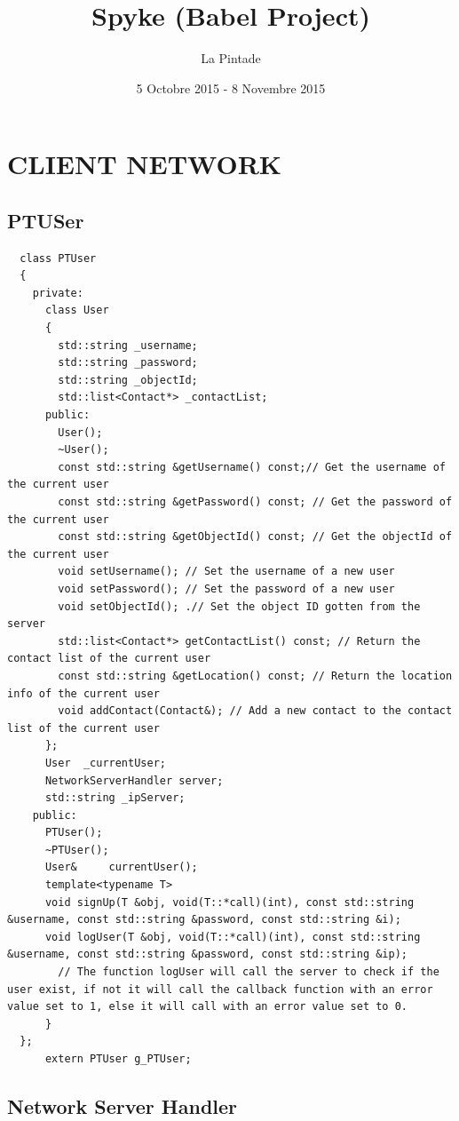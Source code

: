 \documentclass{article}
\title{Spyke (Babel Project)}
\author{La Pintade}
\date{5 Octobre 2015 - 8 Novembre 2015}
\begin{document}
  \maketitle
  \tableofcontents


  \newpage
  \section{CLIENT NETWORK}
  \subsection{PTUSer}
    \begin{lstlisting}
  class PTUser
  {
    private:
      class User
      {
        std::string _username;
        std::string _password;
        std::string _objectId;
        std::list<Contact*> _contactList;
      public:
        User();
        ~User();
        const std::string &getUsername() const;// Get the username of the current user
        const std::string &getPassword() const; // Get the password of the current user
        const std::string &getObjectId() const; // Get the objectId of the current user
        void setUsername(); // Set the username of a new user
        void setPassword(); // Set the password of a new user
        void setObjectId(); .// Set the object ID gotten from the server
        std::list<Contact*> getContactList() const; // Return the contact list of the current user
        const std::string &getLocation() const; // Return the location info of the current user
        void addContact(Contact&); // Add a new contact to the contact list of the current user
      };
      User	_currentUser;
      NetworkServerHandler server;
      std::string _ipServer;
    public:
      PTUser();
      ~PTUser();
      User&		currentUser();
      template<typename T>
      void signUp(T &obj, void(T::*call)(int), const std::string &username, const std::string &password, const std::string &i);
      void logUser(T &obj, void(T::*call)(int), const std::string &username, const std::string &password, const std::string &ip);
        // The function logUser will call the server to check if the user exist, if not it will call the callback function with an error value set to 1, else it will call with an error value set to 0.
      }
  };
      extern PTUser g_PTUser;
\end{lstlisting}

\newpage

\subsection{Network Server Handler}
\end{document}
